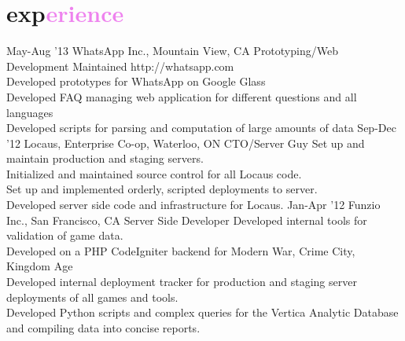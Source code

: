 \documentclass[]{friggeri-cv}
\begin{document}
\section{exp\textcolor{violet}{erience}}

\begin{entrylist}
  \entry
    {May-Aug '13}
    {WhatsApp Inc., Mountain View, CA}
    {Prototyping/Web Development}
    {
    \textendash \hspace{0.1ex} Maintained http://whatsapp.com\\
    \textendash \hspace{0.1ex} Developed prototypes for WhatsApp on Google Glass\\
    \textendash \hspace{0.1ex} Developed FAQ managing web application for different questions and all languages\\
    \textendash \hspace{0.1ex} Developed scripts for parsing and computation of large amounts of data}
  \entry
    {Sep-Dec '12}
    {Locaus, Enterprise Co-op, Waterloo, ON}
    {CTO/Server Guy}
    {\textendash \hspace{0.1ex} Set up and maintain production and staging servers.\\
    \textendash \hspace{0.1ex} Initialized and maintained source control for all Locaus code.\\
    \textendash \hspace{0.1ex} Set up and implemented orderly, scripted deployments to server.\\
    \textendash \hspace{0.1ex} Developed server side code and infrastructure for Locaus.}
  \entry
    {Jan-Apr \hspace{0.5ex}'12}
    {Funzio Inc., San Francisco, CA}
    {Server Side Developer}
    {
    \textendash \hspace{0.1ex} Developed internal tools for validation of game data.\\
    \textendash \hspace{0.1ex} Developed on a PHP CodeIgniter backend for Modern War, Crime City, Kingdom Age\\
    \textendash \hspace{0.1ex} Developed internal deployment tracker for production and staging server deployments of all games and tools.\\
    \textendash \hspace{0.1ex} Developed Python scripts and complex queries for the Vertica Analytic Database and compiling data into concise reports.}
\end{entrylist}
\end{document}
